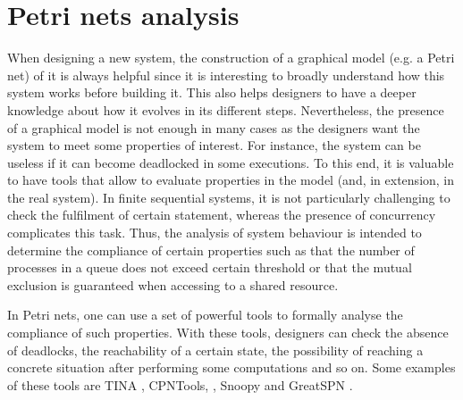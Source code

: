 %
%

\section{Petri nets analysis}
When designing a new system, the construction of a graphical model (e.g. a Petri net) of it is always
helpful since it is interesting to broadly understand how this system works before building it. This also helps designers to have a
deeper knowledge about how it evolves in its different steps. Nevertheless, the presence of a graphical model is not enough in many cases
as the designers want the system to meet some properties of interest. For instance, the system can be useless
if it can become deadlocked in some executions. To this end, it is valuable to have tools that allow to
evaluate properties in the model (and, in extension, in the real system). In finite sequential systems, 
it is not particularly challenging to check
the fulfilment of certain statement, whereas the presence of concurrency complicates this task.
Thus, the analysis of system behaviour is intended to determine the compliance of 
certain properties such as that the number of processes in a queue does not exceed
certain threshold or that the mutual exclusion is guaranteed when accessing to a shared resource.

In Petri nets, one can use a set of powerful tools to formally analyse
the compliance of such properties. With these tools, designers can check
the absence of deadlocks, the reachability of a certain
state, the possibility of reaching a concrete situation after performing some computations and so on.
Some examples of these tools are TINA \cite{TINA}, CPNTools, \cite{CPNTools}, Snoopy \cite{Snoopy} and GreatSPN \cite{GreatSPN}.

